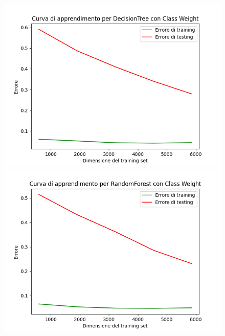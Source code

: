 \begin{figure}[H]
    \centering
    \begin{minipage}[b]{0.45\linewidth}
      \centering
      \includegraphics[scale=0.5]{img/learning_curve_DecisionTree_Class Weight.png}
      
    \end{minipage}
    \hfill
    \begin{minipage}[b]{0.45\linewidth}
      \centering
      \includegraphics[scale=0.5]{img/learning_curve_RandomForest_Class Weight.png}
      
    \end{minipage}
    

\end{figure}
